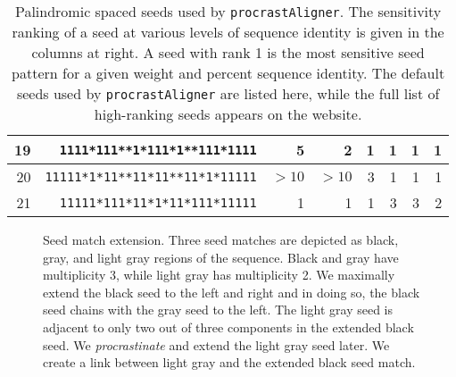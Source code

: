 \documentclass{llncs}
\begin{document}
\begin{table}[h!]
\begin{tabular}{|r|r|r|r|r|r|r|r|}
\hline
19 & \texttt{1111*111**1*111*1**111*1111} & 5 & 2 & 1 & 1 & 1 & 1 \\
\hline
20 & \texttt{11111*1*11**11*11**11*1*11111} & $> 10$ & $> 10$ & 3 & 1 & 1 & 1 \\
\hline
21 & \texttt{11111*111*11*1*11*111*11111} & 1 & 1 & 1 & 3 & 3 & 2 \\
\hline

\end{tabular}
\vspace{0.4cm}
  \caption{Palindromic spaced seeds used by \texttt{procrastAligner}.  The sensitivity ranking
  of a seed at various levels of sequence identity is given
  in the columns at right.  A seed with rank 1 is the most sensitive seed pattern for a given weight and
  percent sequence identity. The default seeds used by \texttt{procrastAligner} are
  listed here, while the full list of high-ranking seeds appears on the website.}\label{table:seedPatterns}
\end{table}


\begin{figure}[t]
\centering {}
\label{fig:simple_extension} \vspace{-0.2cm}\caption{Seed match
extension. Three seed matches are depicted as black, gray, and
light gray regions of the sequence.  Black and gray have
multiplicity 3, while light gray has multiplicity 2.  We maximally
extend the black seed to the left and right and in doing so, the
black seed chains with the gray seed to the left. The light gray
seed is adjacent to only two out of three components in the
extended black seed.  We \textit{procrastinate} and extend the
light gray seed later.  We create a link between light gray and
the extended black seed match.}
\end{figure}
\end{document}
